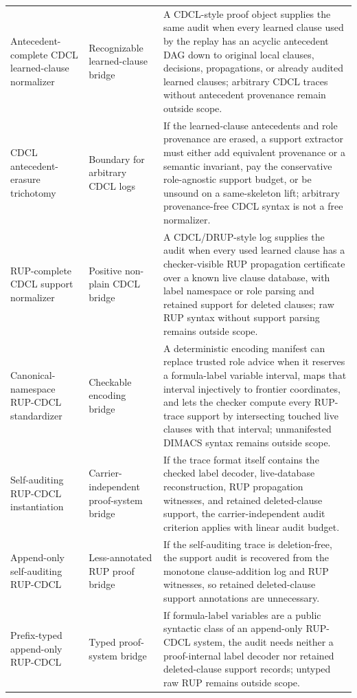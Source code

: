 \documentclass[11pt]{article}
\theoremstyle{definition}
\begin{document}
{\begin{longtable}{@{}p{}p{}p{}@{}}
Antecedent-complete CDCL learned-clause normalizer & Recognizable learned-clause bridge & A CDCL-style proof object supplies the same audit when every learned clause used by the replay has an acyclic antecedent DAG down to original local clauses, decisions, propagations, or already audited learned clauses; arbitrary CDCL traces without antecedent provenance remain outside scope. \\
CDCL antecedent-erasure trichotomy & Boundary for arbitrary CDCL logs & If the learned-clause antecedents and role provenance are erased, a support extractor must either add equivalent provenance or a semantic invariant, pay the conservative role-agnostic support budget, or be unsound on a same-skeleton lift; arbitrary provenance-free CDCL syntax is not a free normalizer. \\
RUP-complete CDCL support normalizer & Positive non-plain CDCL bridge & A CDCL/DRUP-style log supplies the audit when every used learned clause has a checker-visible RUP propagation certificate over a known live clause database, with label namespace or role parsing and retained support for deleted clauses; raw RUP syntax without support parsing remains outside scope. \\
Canonical-namespace RUP-CDCL standardizer & Checkable encoding bridge & A deterministic encoding manifest can replace trusted role advice when it reserves a formula-label variable interval, maps that interval injectively to frontier coordinates, and lets the checker compute every RUP-trace support by intersecting touched live clauses with that interval; unmanifested DIMACS syntax remains outside scope. \\
Self-auditing RUP-CDCL instantiation & Carrier-independent proof-system bridge & If the trace format itself contains the checked label decoder, live-database reconstruction, RUP propagation witnesses, and retained deleted-clause support, the carrier-independent audit criterion applies with linear audit budget. \\
Append-only self-auditing RUP-CDCL & Less-annotated RUP proof bridge & If the self-auditing trace is deletion-free, the support audit is recovered from the monotone clause-addition log and RUP witnesses, so retained deleted-clause support annotations are unnecessary. \\
Prefix-typed append-only RUP-CDCL & Typed proof-system bridge & If formula-label variables are a public syntactic class of an append-only RUP-CDCL system, the audit needs neither a proof-internal label decoder nor retained deleted-clause support records; untyped raw RUP remains outside scope. \\

\end{longtable}}
\end{document}
